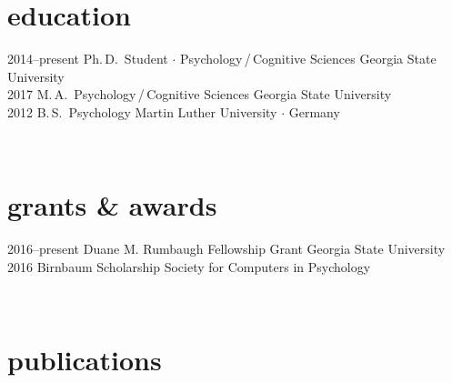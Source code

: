 \documentclass[]{friggeri-cv}
\begin{document}
\section{education}

\begin{entrylist}
  \entry
    {2014--present}
    {Ph.\,D.~Student $\cdot$ Psychology\,/\,Cognitive Sciences}
    {Georgia State University}
    {\\[-.7cm]}
 \entry
   {2017}
   {M.\,A.~Psychology\,/\,Cognitive Sciences}
   {Georgia State University}
   {\\[-.7cm]}
  \entry
    {2012}
    {B.\,S.~Psychology}
    {Martin Luther University $\cdot$ Germany}
    {}
\end{entrylist}\\[-.1cm]


\section{grants \& awards}

\begin{entrylist}
  \entry
    {2016--present}
    {Duane M. Rumbaugh Fellowship Grant}
    {Georgia State University}
    {\\[-.75cm]}
  \entry
    {2016}
    {Birnbaum Scholarship}
    {Society for Computers in Psychology}
    {}
\end{entrylist}\\[-.1cm]


\section{publications}


\end{document}
